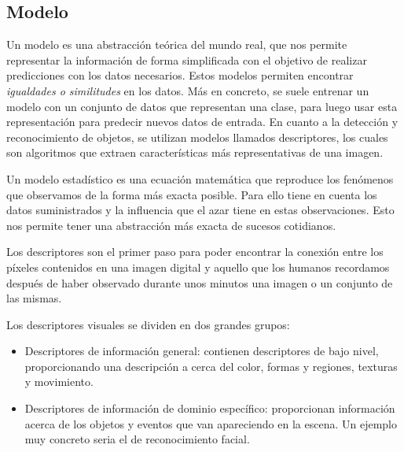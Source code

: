 \subsection{Modelo}
\label{subsec:modelo}
Un modelo es una abstracción teórica del mundo real, que nos permite representar la información de forma simplificada con el objetivo de realizar predicciones con los datos necesarios. Estos modelos permiten encontrar \textit{igualdades o similitudes} en los datos. Más en concreto, se suele entrenar un modelo con un conjunto de datos que representan una clase, para luego usar esta representación para predecir nuevos datos de entrada. En cuanto a la detección y reconocimiento de objetos, se utilizan modelos llamados descriptores, los cuales son algoritmos que extraen características más representativas de una imagen. 

\begin{definition}\label{def:mod_est}
Un modelo estadístico es una ecuación matemática que reproduce los fenómenos que observamos de la forma más exacta posible. Para ello tiene en cuenta los datos suministrados y la influencia que el azar tiene en estas observaciones. Esto nos permite tener una abstracción más exacta de sucesos cotidianos.
\end{definition}
 
\begin{definition}[Descriptor]\label{def:desc}
Los descriptores son el primer paso para poder encontrar la conexión entre los píxeles contenidos en una imagen digital y aquello que los humanos recordamos después de haber observado durante unos minutos una imagen o un conjunto de las mismas.

Los descriptores visuales se dividen en dos grandes grupos:
\begin{itemize}
\item Descriptores de información general: contienen descriptores de bajo nivel, proporcionando una descripción a cerca del color, formas y regiones, texturas y movimiento.
\item Descriptores de información de dominio específico: proporcionan información acerca de los objetos y eventos que van apareciendo en la escena. Un ejemplo muy concreto seria el de reconocimiento facial.
\end{itemize}

\end{definition}


